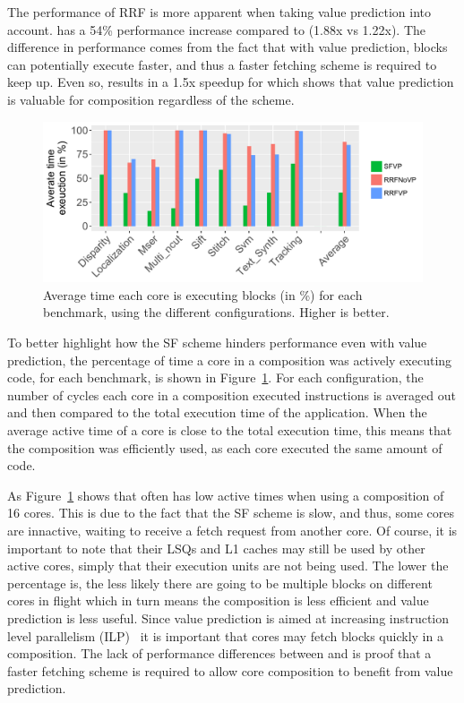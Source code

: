 The performance of RRF is more apparent when taking value prediction into account.
\nfvp{} has a 54\% performance increase compared to \vp{} (1.88x vs 1.22x).
The difference in performance comes from the fact that with value prediction, blocks can potentially execute faster, and thus a faster fetching scheme is required to keep up.
Even so, \vp{} results in a 1.5x speedup for  which shows that value prediction is valuable for composition regardless of the scheme.

\begin{figure}[t]
    \centering
    \includegraphics[width=1\textwidth]{chapter3/graphics/perf_av_cycle_exec4.pdf}
    \caption{Average time each core is executing blocks (in \%) for each benchmark, using the different configurations. Higher is better.}
    \label{fig:perf_av_cycle}
	\vspace{1em}
\end{figure}

To better highlight how the SF scheme hinders performance even with value prediction, the percentage of time a core in a composition was actively executing code, for each benchmark, is shown in Figure~\ref{fig:perf_av_cycle}.
For each configuration, the number of cycles each core in a composition executed instructions is averaged out and then compared to the total execution time of the application.
When the average active time of a core is close to the total execution time, this means that the composition was efficiently used, as each core executed the same amount of code.

As Figure~\ref{fig:perf_av_cycle} shows that \vp{} often has low active times when using a composition of 16 cores.
This is due to the fact that the SF scheme is slow, and thus, some cores are innactive, waiting to receive a fetch request from another core.
Of course, it is important to note that their LSQs and L1 caches may still be used by other active cores, simply that their execution units are not being used.
The lower the percentage is, the less likely there are going to be multiple blocks on different cores in flight which in turn means the composition is less efficient and value prediction is less useful.
Since value prediction is aimed at increasing instruction level parallelism (ILP)~\cite{peraisBeBop2015} it is important that cores may fetch blocks quickly in a composition.
The lack of performance differences between \novp{} and \vp{} is proof that a faster fetching scheme is required to allow core composition to benefit from value prediction.

